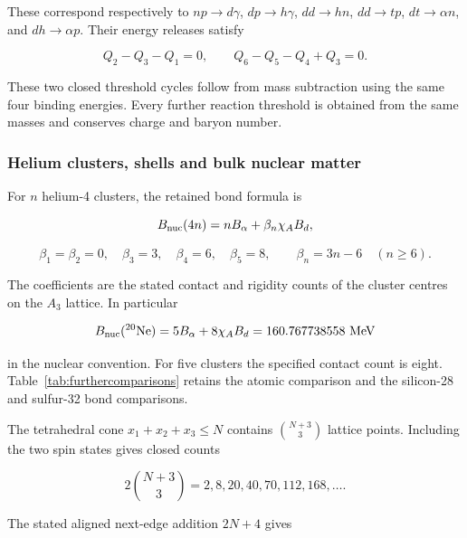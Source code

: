 \documentclass[aps,prx,onecolumn,10pt,notitlepage,nofootinbib,longbibliography]{revtex4-2}
\numberwithin{equation}{section}
\numberwithin{table}{section}
\begin{document}
These correspond respectively to \(np\to d\gamma\), \(dp\to h\gamma\), \(dd\to hn\), \(dd\to tp\), \(dt\to\alpha n\), and \(dh\to\alpha p\). Their energy releases satisfy

\begin{equation}
Q_2-Q_3-Q_1=0,\qquad Q_6-Q_5-Q_4+Q_3=0.
\label{eq:attempt-S11-2}
\end{equation}

These two closed threshold cycles follow from mass subtraction using the same four binding energies. Every further reaction threshold is obtained from the same masses and conserves charge and baryon number.

\subsubsection{Helium clusters, shells and bulk nuclear matter}\label{helium-clusters-shells-and-bulk-nuclear-matter}

For \(n\) helium-4 clusters, the retained bond formula is

\begin{equation}
B_{\rm nuc}(4n)=nB_\alpha+\beta_n\chi_AB_d,
\end{equation}

\begin{equation}
\beta_1=\beta_2=0,\quad\beta_3=3,\quad\beta_4=6,\quad\beta_5=8,
\qquad \beta_n=3n-6\quad(n\ge6).
\label{eq:attempt-S12-1}
\end{equation}

The coefficients are the stated contact and rigidity counts of the cluster centres on the \(A_3\) lattice. In particular

\begin{equation}
B_{\rm nuc}({}^{20}{\rm Ne})=5B_\alpha+8\chi_AB_d=160.767738558\ \mathrm{MeV}
\end{equation}

in the nuclear convention. For five clusters the specified contact count
is eight. Table~\ref{tab:furthercomparisons} retains the atomic comparison
and the silicon-28 and sulfur-32 bond comparisons.

The tetrahedral cone \(x_1+x_2+x_3\le N\) contains \(\binom{N+3}3\) lattice points. Including the two spin states gives closed counts

\begin{equation}
2\binom{N+3}3=2,8,20,40,70,112,168,\ldots .
\end{equation}

The stated aligned next-edge addition \(2N+4\) gives
\end{document}
